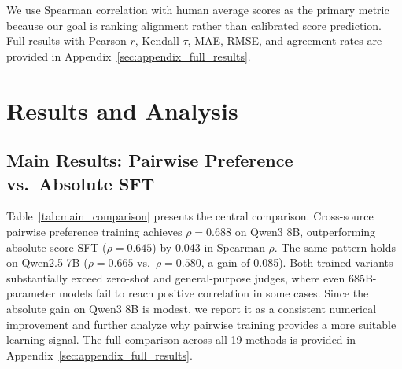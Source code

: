 \documentclass[11pt]{article}
\begin{document}
We use Spearman correlation with human average scores as the primary metric because our goal is ranking alignment rather than calibrated score prediction.
Full results with Pearson $r$, Kendall $\tau$, MAE, RMSE, and agreement rates are provided in Appendix~\ref{sec:appendix_full_results}.


\section{Results and Analysis}
\label{sec:experiments}

\subsection{Main Results: Pairwise Preference vs.\ Absolute SFT}

Table~\ref{tab:main_comparison} presents the central comparison.
Cross-source pairwise preference training achieves $\rho=0.688$ on Qwen3 8B, outperforming absolute-score SFT ($\rho=0.645$) by 0.043 in Spearman $\rho$.
The same pattern holds on Qwen2.5 7B ($\rho=0.665$ vs.\ $\rho=0.580$, a gain of 0.085).
Both trained variants substantially exceed zero-shot and general-purpose judges, where even 685B-parameter models fail to reach positive correlation in some cases.
Since the absolute gain on Qwen3 8B is modest, we report it as a consistent numerical improvement and further analyze why pairwise training provides a more suitable learning signal.
The full comparison across all 19 methods is provided in Appendix~\ref{sec:appendix_full_results}.

\begin{table}[h]
\centering
\caption{Main comparison: pairwise preference training outperforms absolute-score SFT and zero-shot judges on Chinese rewriting evaluation.}
\label{tab:main_comparison}
\end{table}
\end{document}
